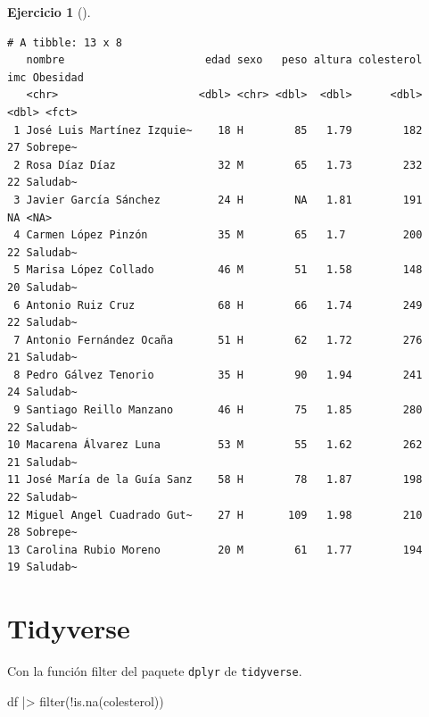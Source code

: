 \documentclass[
  a4paper,
]{scrreport}
\newenvironment{Shaded}{\begin{snugshade}}{\end{snugshade}}
\newcommand{\FunctionTok}[1]{\textcolor[rgb]{0.28,0.35,0.67}{#1}}
\newcommand{\NormalTok}[1]{\textcolor[rgb]{0.00,0.23,0.31}{#1}}
\newcommand{\SpecialCharTok}[1]{\textcolor[rgb]{0.37,0.37,0.37}{#1}}
\theoremstyle{definition}
\newtheorem{exercise}{Ejercicio}[chapter]
\theoremstyle{remark}
\begin{document}
\begin{exercise}[]
\begin{enumerate}
\begin{tcolorbox}
\begin{Shaded}
\end{Shaded}

\begin{verbatim}
# A tibble: 13 x 8
   nombre                      edad sexo   peso altura colesterol   imc Obesidad
   <chr>                      <dbl> <chr> <dbl>  <dbl>      <dbl> <dbl> <fct>   
 1 José Luis Martínez Izquie~    18 H        85   1.79        182    27 Sobrepe~
 2 Rosa Díaz Díaz                32 M        65   1.73        232    22 Saludab~
 3 Javier García Sánchez         24 H        NA   1.81        191    NA <NA>    
 4 Carmen López Pinzón           35 M        65   1.7         200    22 Saludab~
 5 Marisa López Collado          46 M        51   1.58        148    20 Saludab~
 6 Antonio Ruiz Cruz             68 H        66   1.74        249    22 Saludab~
 7 Antonio Fernández Ocaña       51 H        62   1.72        276    21 Saludab~
 8 Pedro Gálvez Tenorio          35 H        90   1.94        241    24 Saludab~
 9 Santiago Reillo Manzano       46 H        75   1.85        280    22 Saludab~
10 Macarena Álvarez Luna         53 M        55   1.62        262    21 Saludab~
11 José María de la Guía Sanz    58 H        78   1.87        198    22 Saludab~
12 Miguel Angel Cuadrado Gut~    27 H       109   1.98        210    28 Sobrepe~
13 Carolina Rubio Moreno         20 M        61   1.77        194    19 Saludab~
\end{verbatim}

  \section{Tidyverse}

  Con la función filter del paquete \texttt{dplyr} de
  \texttt{tidyverse}.

\begin{Shaded}
\begin{Highlighting}[]
\NormalTok{df }\SpecialCharTok{|\textgreater{}} \FunctionTok{filter}\NormalTok{(}\SpecialCharTok{!}\FunctionTok{is.na}\NormalTok{(colesterol))}
\end{Highlighting}
\end{Shaded}


\end{tcolorbox}
\end{enumerate}
\end{exercise}
\end{document}
